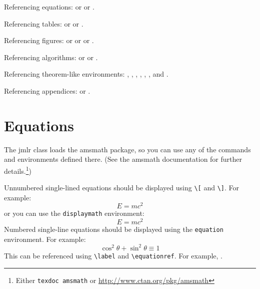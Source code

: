 \documentclass[tablecaption=bottom,wcp]{jmlr} %
\begin{document}
Referencing equations:  or
 or
.

Referencing tables:  or
 or
.

Referencing figures:  or
 or
 or
.

Referencing algorithms:  or
 or
.

Referencing theorem-like environments: ,
, ,
, ,
,  and
.

Referencing appendices:  or
.

\section{Equations}
\label{sec:math}

The \textsf{jmlr} class loads the \textsf{amsmath} package, so
you can use any of the commands and environments defined there.
(See the \textsf{amsmath} documentation for further
details.\footnote{Either \texttt{texdoc amsmath} or
  \url{http://www.ctan.org/pkg/amsmath}})

Unnumbered single-lined equations should be displayed using
\verb|\[| and \verb|\]|. For example:
\[E = m c^2\]
or you can use the \texttt{displaymath} environment:
\begin{displaymath}
  E = m c^2
\end{displaymath}
Numbered single-line equations should be displayed using the
\texttt{equation} environment. For example:
\begin{equation}\label{eq:trigrule}
  \cos^2\theta + \sin^2\theta \equiv 1
\end{equation}
This can be referenced using \verb|\label| and \verb|\equationref|.
For example, .
\end{document}
